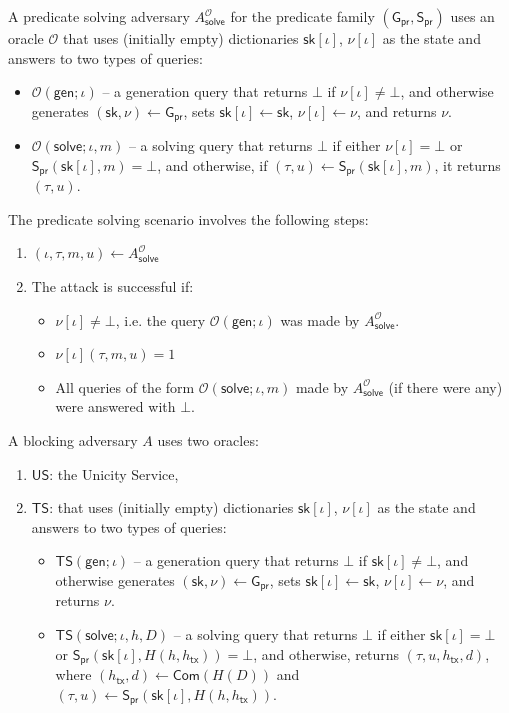 \documentclass{article}
\newcommand{\prikey}[0]{\mathsf{sk}}
\newcommand{\commit}[0]{\mathsf{Com}}
\newcommand{\txhash}[0]{h_\mathsf{tx}}
\newcommand{\predi}[0]{\nu}
\newcommand{\systime}[0]{\tau}
\newcommand{\prgen}[0]{\mathsf{G}_\mathsf{pr}}
\newcommand{\prsig}[0]{\mathsf{S}_\mathsf{pr}}
\begin{document}
\medskip
\noindent A predicate solving adversary $A_\mathsf{solve}^\mathcal{O}$ for the predicate family $(\prgen,\prsig)$ uses an oracle $\mathcal{O}$
that uses (initially empty) dictionaries $\prikey[\iota]$, $\predi[\iota]$ as the state and answers to two types of queries:
\begin{itemize}
\item $\mathcal{O}(\mathsf{gen};\iota)$ -- a generation query that returns $\bot$ if $\predi[\iota]\neq \bot$, and otherwise generates $(\prikey,\predi)\gets\prgen$, sets $\prikey[\iota]\gets \prikey$, $\predi[\iota]\gets\predi$, and
returns $\predi$.
\item $\mathcal{O}(\mathsf{solve};\iota,m)$ -- a solving query that returns
$\bot$ if either $\predi[\iota]=\bot$ or $\prsig(\prikey[\iota],m)=\bot$, and otherwise, if $(\systime,u)\gets \prsig(\prikey[\iota],m)$, it returns $(\systime,u)$.
\end{itemize}
The predicate solving scenario involves the following steps:
\begin{enumerate}
\item $(\iota,\systime,m,u)\gets A_\mathsf{solve}^\mathcal{O}$
\item The attack is successful if:
\begin{itemize}
\item[a)] $\predi[\iota]\neq\bot$, i.e. the query $\mathcal{O}(\mathsf{gen};\iota)$ was made by $A_\mathsf{solve}^\mathcal{O}$.
\item[b)] $\predi[\iota](\systime,m,u)=1$
\item[c)] All queries of the form $\mathcal{O}(\mathsf{solve};\iota,m)$ made by  $A_\mathsf{solve}^\mathcal{O}$ (if there were any) were answered with $\bot$.
\end{itemize}
\end{enumerate}

\noindent A blocking adversary $A$ uses two oracles:
\begin{enumerate}
\item $\mathsf{US}$: the Unicity Service,
\item $\mathsf{TS}$: that uses (initially empty) dictionaries $\prikey[\iota]$, $\predi[\iota]$ as the state and answers to two types of queries:
\begin{itemize}
\item $\mathsf{TS}(\mathsf{gen};\iota)$ -- a generation query that returns $\bot$ if $\prikey[\iota]\neq \bot$, and otherwise generates $(\prikey,\predi)\gets\prgen$, sets $\prikey[\iota]\gets \prikey$, $\predi[\iota]\gets\predi$, and
returns $\predi$.
\item $\mathsf{TS}(\mathsf{solve};\iota,h,D)$ -- a solving query that returns
$\bot$ if either $\prikey[\iota]=\bot$ or $\prsig(\prikey[\iota],H(h,\txhash))=\bot$, and otherwise, returns $(\systime,u, \txhash, d)$, where
$(\txhash, d)\gets \commit(H(D))$ and
$(\systime,u)\gets \prsig(\prikey[\iota],H(h,\txhash))$.
\end{itemize}
\end{enumerate}
\end{document}
